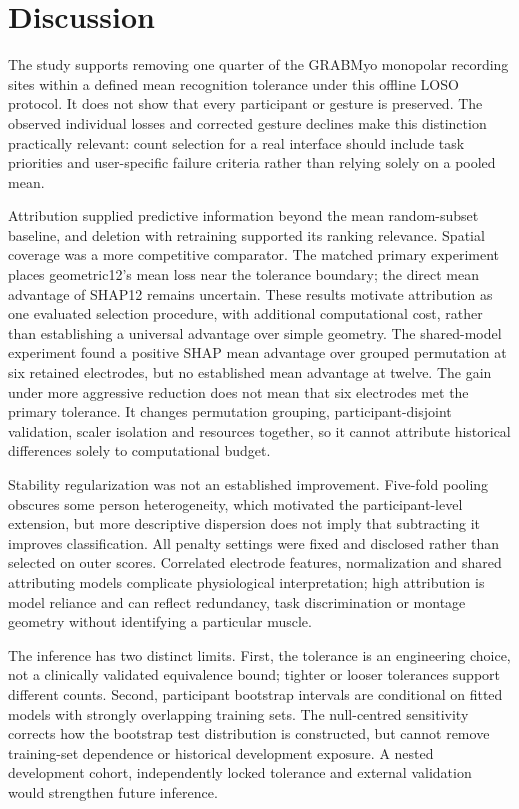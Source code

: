 \section{Discussion}
The study supports removing one quarter of the GRABMyo monopolar recording sites within a defined mean recognition tolerance under this offline LOSO protocol. It does not show that every participant or gesture is preserved. The observed individual losses and corrected gesture declines make this distinction practically relevant: count selection for a real interface should include task priorities and user-specific failure criteria rather than relying solely on a pooled mean.

Attribution supplied predictive information beyond the mean random-subset baseline, and deletion with retraining supported its ranking relevance. Spatial coverage was a more competitive comparator. The matched primary experiment places geometric12's mean loss near the tolerance boundary; the direct mean advantage of SHAP12 remains uncertain. These results motivate attribution as one evaluated selection procedure, with additional computational cost, rather than establishing a universal advantage over simple geometry. The shared-model experiment found a positive SHAP mean advantage over grouped permutation at six retained electrodes, but no established mean advantage at twelve. The gain under more aggressive reduction does not mean that six electrodes met the primary tolerance. It changes permutation grouping, participant-disjoint validation, scaler isolation and resources together, so it cannot attribute historical differences solely to computational budget.

Stability regularization was not an established improvement. Five-fold pooling obscures some person heterogeneity, which motivated the participant-level extension, but more descriptive dispersion does not imply that subtracting it improves classification. All penalty settings were fixed and disclosed rather than selected on outer scores. Correlated electrode features, normalization and shared attributing models complicate physiological interpretation; high attribution is model reliance and can reflect redundancy, task discrimination or montage geometry without identifying a particular muscle.

The inference has two distinct limits. First, the tolerance is an engineering choice, not a clinically validated equivalence bound; tighter or looser tolerances support different counts. Second, participant bootstrap intervals are conditional on fitted models with strongly overlapping training sets. The null-centred sensitivity corrects how the bootstrap test distribution is constructed, but cannot remove training-set dependence or historical development exposure. A nested development cohort, independently locked tolerance and external validation would strengthen future inference.

